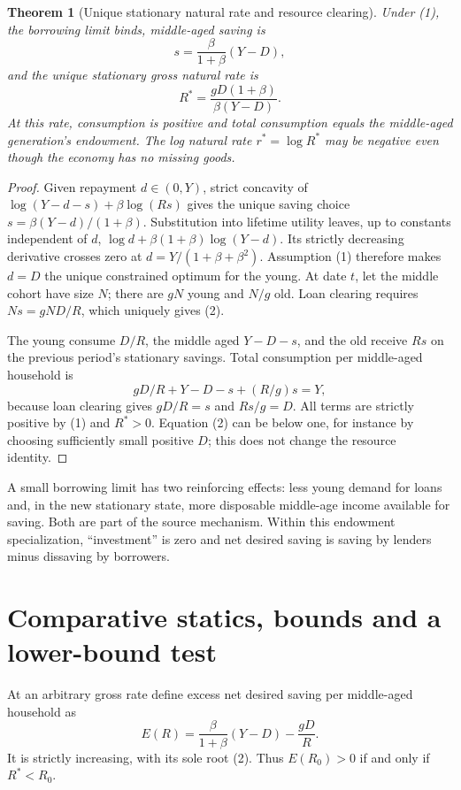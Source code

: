 \documentclass[11pt]{article}
\newtheorem{theorem}{Theorem}
\theoremstyle{remark}
\begin{document}
\begin{theorem}[Unique stationary natural rate and resource clearing]
Under (1), the borrowing limit binds, middle-aged saving is
\[
 s=\frac{\beta}{1+\beta}(Y-D),
\]
and the unique stationary gross natural rate is
\[
 R^*=\frac{gD(1+\beta)}{\beta(Y-D)}.                              \tag{2}
\]
At this rate, consumption is positive and total consumption equals the
middle-aged generation's endowment. The log natural rate $r^*=\log R^*$
may be negative even though the economy has no missing goods.
\end{theorem}
\begin{proof}
Given repayment $d\in(0,Y)$, strict concavity of
$\log(Y-d-s)+\beta\log(Rs)$ gives the unique saving choice
$s=\beta(Y-d)/(1+\beta)$. Substitution into lifetime utility leaves,
up to constants independent of $d$,
$\log d+\beta(1+\beta)\log(Y-d)$. Its strictly decreasing derivative
crosses zero at $d=Y/(1+\beta+\beta^2)$. Assumption (1) therefore makes
$d=D$ the unique constrained optimum for the young. At date $t$, let the
middle cohort have size $N$; there are $gN$ young and $N/g$ old.
Loan clearing requires $Ns=gND/R$, which uniquely gives (2).

The young consume $D/R$, the middle aged $Y-D-s$, and the old receive
$Rs$ on the previous period's stationary savings. Total consumption per
middle-aged household is
\[
 gD/R+Y-D-s+(R/g)s=Y,
\]
because loan clearing gives $gD/R=s$ and $Rs/g=D$.
All terms are strictly positive by (1) and $R^*>0$. Equation (2) can be
below one, for instance by choosing sufficiently small positive $D$;
this does not change the resource identity.
\end{proof}
A small borrowing limit has two reinforcing effects: less young demand
for loans and, in the new stationary state, more disposable middle-age
income available for saving. Both are part of the source mechanism.
Within this endowment specialization, ``investment'' is zero and net
desired saving is saving by lenders minus dissaving by borrowers.

\section{Comparative statics, bounds and a lower-bound test}
At an arbitrary gross rate define excess net desired saving per
middle-aged household as
\[
 E(R)=\frac{\beta}{1+\beta}(Y-D)-\frac{gD}{R}.                     \tag{3}
\]
It is strictly increasing, with its sole root (2). Thus $E(R_0)>0$ if
and only if $R^*<R_0$.
\end{document}
